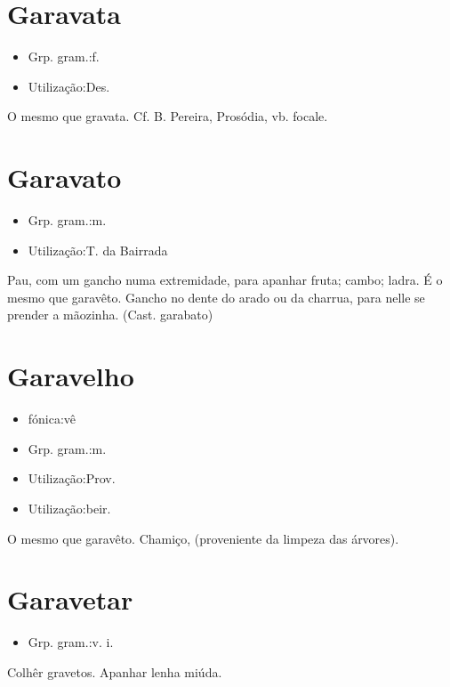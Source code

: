 \section{Garavata}
\begin{itemize}
\item {Grp. gram.:f.}
\end{itemize}
\begin{itemize}
\item {Utilização:Des.}
\end{itemize}
O mesmo que \textunderscore gravata\textunderscore . Cf. B. Pereira, \textunderscore Prosódia\textunderscore , vb. \textunderscore focale\textunderscore .
\section{Garavato}
\begin{itemize}
\item {Grp. gram.:m.}
\end{itemize}
\begin{itemize}
\item {Utilização:T. da Bairrada}
\end{itemize}
Pau, com um gancho numa extremidade, para apanhar fruta; cambo; ladra.
É o mesmo que \textunderscore garavêto\textunderscore .
Gancho no dente do arado ou da charrua, para nelle se prender a mãozinha.
(Cast. \textunderscore garabato\textunderscore )
\section{Garavelho}
\begin{itemize}
\item {fónica:vê}
\end{itemize}
\begin{itemize}
\item {Grp. gram.:m.}
\end{itemize}
\begin{itemize}
\item {Utilização:Prov.}
\end{itemize}
\begin{itemize}
\item {Utilização:beir.}
\end{itemize}
O mesmo que \textunderscore garavêto\textunderscore .
Chamiço, (proveniente da limpeza das árvores).
\section{Garavetar}
\begin{itemize}
\item {Grp. gram.:v. i.}
\end{itemize}
Colhêr gravetos.
Apanhar lenha miúda.
